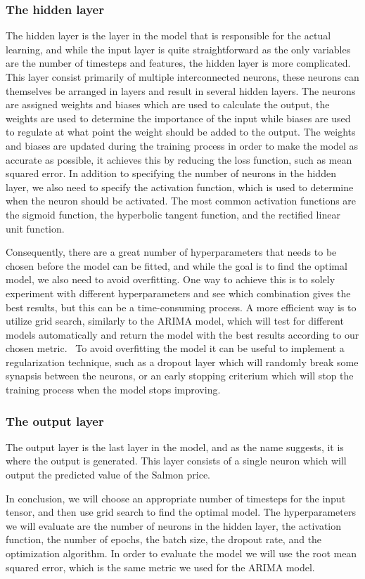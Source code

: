 \subsubsection{The hidden layer}
The hidden layer is the layer in the model that is responsible for the actual learning, and while the input layer is quite straightforward as the only variables are the number of timesteps and features, the hidden layer is more complicated. This layer consist primarily of multiple interconnected neurons, these neurons can themselves be arranged in layers and result in several hidden layers. The neurons are assigned weights and biases which are used to calculate the output, the weights are used to determine the importance of the input while biases are used to regulate at what point the weight should be added to the output. The weights and biases are updated during the training process in order to make the model as accurate as possible, it achieves this by reducing the loss function, such as mean squared error. In addition to specifying the number of neurons in the hidden layer, we also need to specify the activation function, which is used to determine when the neuron should be activated. The most common activation functions are the sigmoid function, the hyperbolic tangent function, and the rectified linear unit function.~\parencite{sharma_2019}

Consequently, there are a great number of hyperparameters that needs to be chosen before the model can be fitted, and while the goal is to find the optimal model, we also need to avoid overfitting. One way to achieve this is to solely experiment with different hyperparameters and see which combination gives the best results, but this can be a time-consuming process. A more efficient way is to utilize grid search, similarly to the ARIMA model, which will test for different models automatically and return the model with the best results according to our chosen metric.~\parencite{brownlee_2016_grid} To avoid overfitting the model it can be useful to implement a regularization technique, such as a dropout layer which will randomly break some synapsis between the neurons, or an early stopping criterium which will stop the training process when the model stops improving.~\parencite{srivastava_2014}

\subsubsection{The output layer}
The output layer is the last layer in the model, and as the name suggests, it is where the output is generated. This layer consists of a single neuron which will output the predicted value of the Salmon price. 

In conclusion, we will choose an appropriate number of timesteps for the input tensor, and then use grid search to find the optimal model. The hyperparameters we will evaluate are the number of neurons in the hidden layer, the activation function, the number of epochs, the batch size, the dropout rate, and the optimization algorithm. In order to evaluate the model we will use the root mean squared error, which is the same metric we used for the ARIMA model.